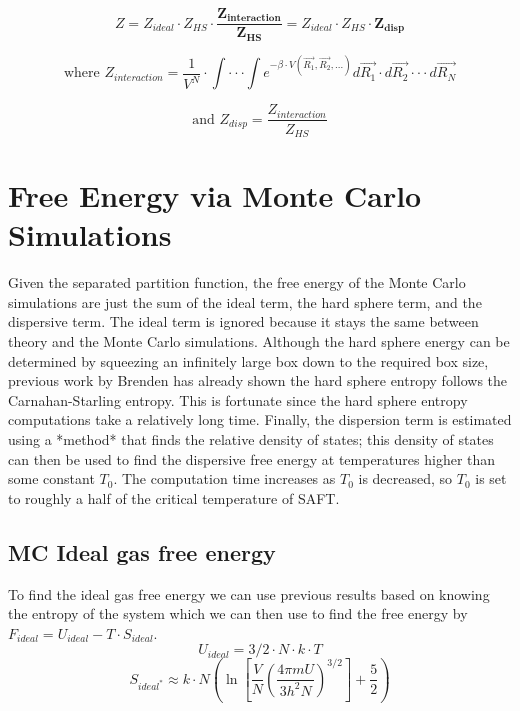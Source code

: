 \begin{equation}\label{eq:disp1}
Z=Z_{ideal}\cdot Z_{HS}\cdot \boldsymbol{\frac{Z_{interaction}}{Z_{HS}}}=Z_{ideal}\cdot Z_{HS}\cdot \boldsymbol{Z_{disp}}
\end{equation}

\begin{equation}\label{eq:disp1}
\text{where }Z_{interaction}=\frac{1}{V^N}\cdot \int\cdot\cdot\cdot\int e^{-\beta\cdot V(\vec{R_1},\vec{R_2},...)}d\vec{R_1}\cdot d\vec{R_2}\cdot\cdot\cdot d\vec{R_N}
\end{equation}

\begin{equation}\label{eq:disp1}
\text{and }Z_{disp}= \frac{Z_{interaction}}{Z_{HS}}
\end{equation}
\section{Free Energy via Monte Carlo Simulations}
Given the separated partition function, the free energy of the Monte Carlo simulations are just the sum of the ideal term, the hard sphere term, and the dispersive term. The ideal term is ignored because it stays the same between theory and the Monte Carlo simulations. Although the hard sphere energy can be determined by squeezing an infinitely large box down to the required box size, previous work by Brenden has already shown the hard sphere entropy follows the Carnahan-Starling entropy. This is fortunate since the hard sphere entropy computations take a relatively long time. Finally, the dispersion term is estimated using a *method* that finds the relative density of states; this density of states can then be used to find the dispersive free energy at temperatures higher than some constant $T_0$. The computation time increases as $T_0$ is decreased, so $T_0$ is set to roughly a half of the critical temperature of SAFT.
\subsection{MC Ideal gas free energy}
To find the ideal gas free energy we can use previous results based on knowing the entropy of the system which we can then use to find the free energy by $F_{ideal}=U_{ideal}-T\cdot S_{ideal}$.
\begin{equation}\label{eq:idealInternalEnergy}
U_{ideal}=3/2\cdot N\cdot k\cdot T
\end{equation}
 \begin{equation}\label{eq:sackurTetrodeApprox} 
S_{ideal^*}\approx k\cdot N \left ( \ln\left [ \frac{V}{N}\left ( \frac{4 \pi m U}{3 h^2 N} \right)^{3/2} \right]+\frac{5}{2}\right )
\end{equation}


